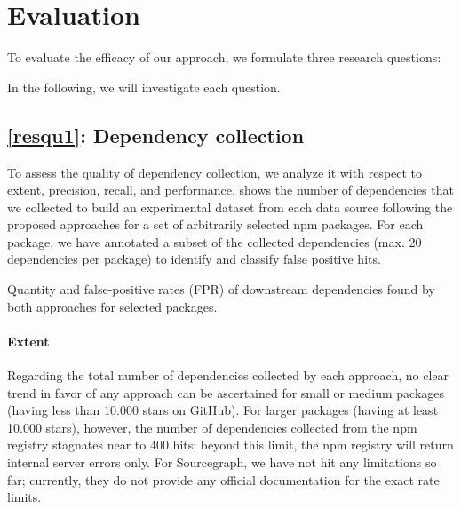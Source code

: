 \section{Evaluation}
\label{sec:evaluation}

To evaluate the efficacy of our approach, we formulate three research questions:


In the following, we will investigate each question.

\subsection{\ref{resqu1}: Dependency collection}
\label{sec:evaluation/resqu1}

To assess the quality of dependency collection, we analyze it with respect to extent, precision, recall, and performance.
 shows the number of dependencies that we collected to build an experimental dataset from each data source following the proposed approaches for a set of arbitrarily selected npm packages.
For each package, we have annotated a subset of the collected dependencies (max. 20 dependencies per package) to identify and classify false positive hits.

\begin{table}
	\caption{Quantity and false-positive rates (FPR) of downstream dependencies found by both approaches for selected packages.}
	\label{tab:evaluation/resqu1/quantities}

	\centering
	\small
	
\end{table}

\paragraph{Extent}
\label{sec:evaluation/resqu1/extent}

Regarding the total number of dependencies collected by each approach, no clear trend in favor of any approach can be ascertained for small or medium packages (having less than \num{10,000} stars on GitHub).
For larger packages (having at least \num{10,000} stars), however, the number of dependencies collected from the npm registry stagnates near to 400 hits; beyond this limit, the npm registry will return internal server errors only.
For Sourcegraph, we have not hit any limitations so far; currently, they do not provide any official documentation for the exact rate limits.

